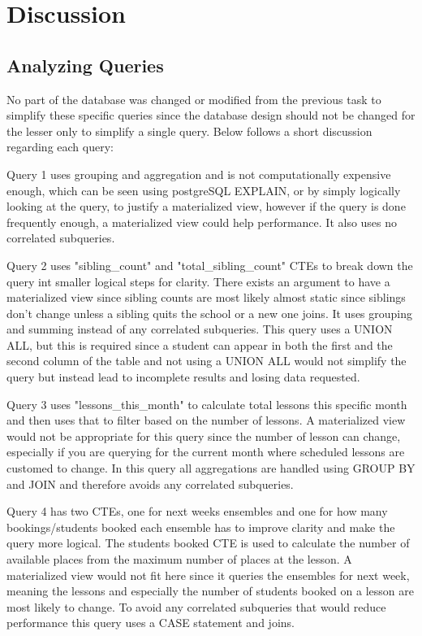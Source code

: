 \documentclass[a4paper]{scrartcl}
\begin{document}
\section{Discussion}

\subsection{Analyzing Queries}
No part of the database was changed or modified from the previous task to simplify these specific queries since the database design should not be changed for the lesser only to simplify a single query. Below follows a short discussion regarding each query:

Query 1 uses grouping and aggregation and is not computationally expensive enough, which can be seen using postgreSQL EXPLAIN, or by simply logically looking at the query, to justify a materialized view, however if the query is done frequently enough, a materialized view could help performance. It also uses no correlated subqueries.
    
Query 2 uses "sibling\_count" and "total\_sibling\_count" CTEs to break down the query int smaller logical steps for clarity. There exists an argument to have a materialized view since sibling counts are most likely almost static since siblings don't change unless a sibling quits the school or a new one joins. It uses grouping and summing instead of any correlated subqueries. This query uses a UNION ALL, but this is required since a student can appear in both the first and the second column of the table and not using a UNION ALL would not simplify the query but instead lead to incomplete results and losing data requested.

Query 3 uses "lessons\_this\_month" to calculate total lessons this specific month and then uses that to filter based on the number of lessons. A materialized view would not be appropriate for this query since the number of lesson can change, especially if you are querying for the current month where scheduled lessons are customed to change. In this query all aggregations are handled using GROUP BY and JOIN and therefore avoids any correlated subqueries.

Query 4 has two CTEs, one for next weeks ensembles and one for how many bookings/students booked each ensemble has to improve clarity and make the query more logical. The students booked CTE is used to calculate the number of available places from the maximum number of places at the lesson. A materialized view would not fit here since it queries the ensembles for next week, meaning the lessons and especially the number of students booked on a lesson are most likely to change. To avoid any correlated subqueries that would reduce performance this query uses a CASE statement and joins. 
\end{document}
